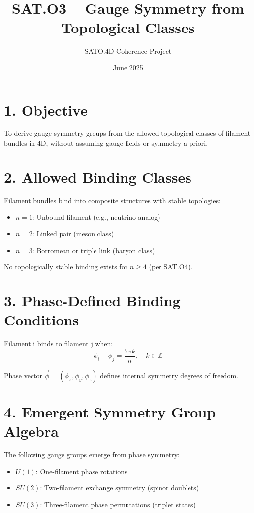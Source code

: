 \documentclass[12pt]{article}
\title{SAT.O3 – Gauge Symmetry from Topological Classes}
\author{SATO.4D Coherence Project}
\date{June 2025}
\begin{document}
\maketitle

\section*{1. Objective}

To derive gauge symmetry groups from the allowed topological classes of filament bundles in 4D, without assuming gauge fields or symmetry a priori.

\section*{2. Allowed Binding Classes}

Filament bundles bind into composite structures with stable topologies:
\begin{itemize}
    \item \( n = 1 \): Unbound filament (e.g., neutrino analog)
    \item \( n = 2 \): Linked pair (meson class)
    \item \( n = 3 \): Borromean or triple link (baryon class)
\end{itemize}

No topologically stable binding exists for \( n \geq 4 \) (per SAT.O4).

\section*{3. Phase-Defined Binding Conditions}

Filament i binds to filament j when:
\[
\phi_i - \phi_j = \frac{2\pi k}{n}, \quad k \in \mathbb{Z}
\]

Phase vector \( \vec{\phi} = (\phi_x, \phi_y, \phi_z) \) defines internal symmetry degrees of freedom.

\section*{4. Emergent Symmetry Group Algebra}

The following gauge groups emerge from phase symmetry:

\begin{itemize}
    \item \( U(1) \): One-filament phase rotations
    \item \( SU(2) \): Two-filament exchange symmetry (spinor doublets)
    \item \( SU(3) \): Three-filament phase permutations (triplet states)
\end{itemize}
\end{document}
